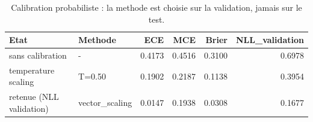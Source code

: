 \begin{table}
\caption{Calibration probabiliste : la methode est choisie sur la validation, jamais sur le test.}
\label{tab:calibration}
\begin{tabular}{llrrrr}
\toprule
Etat & Methode & ECE & MCE & Brier & NLL_validation \\
\midrule
sans calibration & - & 0.4173 & 0.4516 & 0.3100 & 0.6978 \\
temperature scaling & T=0.50 & 0.1902 & 0.2187 & 0.1138 & 0.3954 \\
retenue (NLL validation) & vector_scaling & 0.0147 & 0.1938 & 0.0308 & 0.1677 \\
\bottomrule
\end{tabular}
\end{table}
